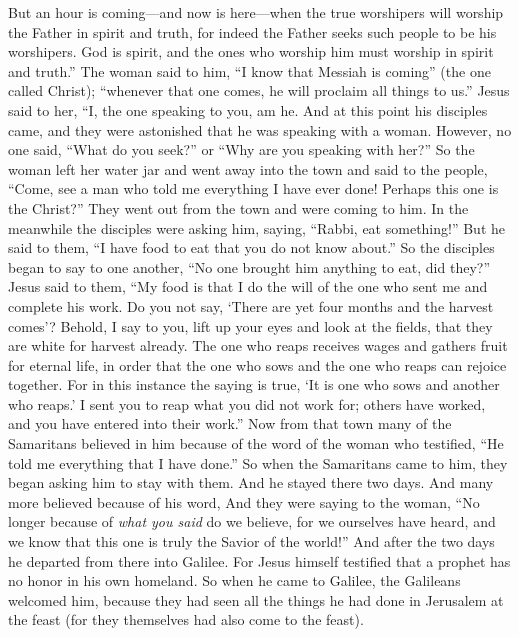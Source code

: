 \begin{biblechapter}
\verse But an hour is coming—and now is here—when the true worshipers will worship the Father in spirit and truth, for indeed the Father seeks such people to be his worshipers.
\verse God is spirit, and the ones who worship him must worship in spirit and truth.”
\verse The woman said to him, “I know that Messiah is coming” (the one called Christ); “whenever that one comes, he will proclaim all things to us.”
\verse Jesus said to her, “I, the one speaking to you, am he.
 And at this point his disciples came, and they were astonished that he was speaking with a woman. However, no one said, “What do you seek?” or “Why are you speaking with her?”
\verse So the woman left her water jar and went away into the town and said to the people,
\verse “Come, see a man who told me everything I have ever done! Perhaps this one is the Christ?”
\verse They went out from the town and were coming to him.
\verse In the meanwhile the disciples were asking him, saying, “Rabbi, eat something!”
\verse But he said to them, “I have food to eat that you do not know about.”
\verse So the disciples began to say to one another, “No one brought him anything to eat, did they?”
\verse Jesus said to them, “My food is that I do the will of the one who sent me and complete his work.
\verse Do you not say, ‘There are yet four months and the harvest comes’? Behold, I say to you, lift up your eyes and look at the fields, that they are white for harvest already.
\verse The one who reaps receives wages and gathers fruit for eternal life, in order that the one who sows and the one who reaps can rejoice together.
\verse For in this instance the saying is true, ‘It is one who sows and another who reaps.’
\verse I sent you to reap what you did not work for; others have worked, and you have entered into their work.”
 Now from that town many of the Samaritans believed in him because of the word of the woman who testified, “He told me everything that I have done.”
\verse So when the Samaritans came to him, they began asking him to stay with them. And he stayed there two days.
\verse And many more believed because of his word,
\verse And they were saying to the woman, “No longer because of \textit{what you said} do we believe, for we ourselves have heard, and we know that this one is truly the Savior of the world!”
 And after the two days he departed from there into Galilee.
\verse For Jesus himself testified that a prophet has no honor in his own homeland.
\verse So when he came to Galilee, the Galileans welcomed him, because they had seen all the things he had done in Jerusalem at the feast (for they themselves had also come to the feast).

\end{biblechapter}
